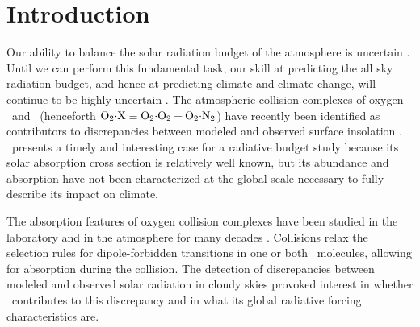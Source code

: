 \documentclass[agupp,twoside]{aguplus} %
\begin{document}
\begin{abstract}

\end{abstract}

\section{Introduction}\label{sxn:ntr}


\nocite{EPP95,GOB90,MCB98,PEP97,SPS98}

\setlength{\footnotesep}{12pt} 

Our ability to balance the solar radiation budget of the atmosphere is
uncertain \cite[e.g.,][and references
therein]{StT902,KAC97,RaV97,Col98}.  
Until we can perform this fundamental task, our skill at
predicting the all sky radiation budget, and hence at predicting
climate and climate change, will continue to be highly uncertain
\cite[e.g.,][]{CPB89}. 
The atmospheric collision complexes of oxygen \OdOd\ and \OdNd\
(henceforth $\OdX \equiv \OdOd + \OdNd$) have recently been
identified as contributors to discrepancies between modeled and
observed surface insolation \cite[]{PEP97,SPS98}.  
\OdX\ presents a timely and interesting case for a radiative budget
study because its solar absorption cross section is relatively well
known, but its abundance and absorption have not been characterized at
the global scale necessary to fully describe its impact on climate. 

The absorption features of oxygen collision complexes have been
studied in the laboratory and in the atmosphere for many decades
\cite[][and references therein]{PeP80,SPS98}.   
Collisions relax the selection rules for dipole-forbidden transitions
in one or both \Od\ molecules, allowing for absorption during the
collision. 
The detection of discrepancies between modeled and observed solar
radiation in cloudy skies \cite[]{CZM95,RaV97} provoked interest in
whether \OdX\ contributes to this discrepancy \cite[]{EPP95,MGL97}
and in what its global radiative forcing characteristics are.
\end{document}
